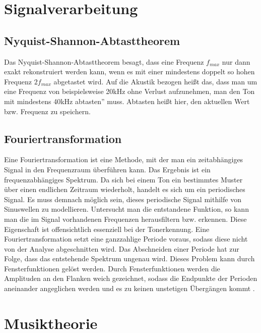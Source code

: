 \section{Signalverarbeitung}
\subsection*{Nyquist-Shannon-Abtasttheorem}
\label{sec:Abtast}
Das Nyquist-Shannon-Abtasttheorem besagt, dass eine Frequenz $f_{max}$ nur dann exakt rekonstruiert werden kann, wenn es mit einer mindestens doppelt so hohen Frequenz $2f_{max}$ abgetastet wird. Auf die Akustik bezogen heißt das, dass man um eine Frequenz von beispielsweise 20kHz ohne Verlust aufzunehmen, man den Ton mit mindestens 40kHz \glqq abtasten'' muss. Abtasten heißt hier, den aktuellen Wert bzw. Frequenz zu speichern. 

\subsection*{Fouriertransformation}
\label{sec:Fouriertransformation}
Eine Fouriertransformation ist eine Methode, mit der man ein zeitabhängiges Signal in den Frequenzraum überführen kann. Das Ergebnis ist ein frequenzabhängiges Spektrum.
Da sich bei einem Ton ein bestimmtes Muster über einen endlichen Zeitraum wiederholt, handelt es sich um ein periodisches Signal. Es muss demnach möglich sein, dieses periodische Signal mithilfe von Sinuswellen zu modellieren. Untersucht man die entstandene Funktion, so kann man die im Signal vorhandenen Frequenzen herausfiltern bzw. erkennen. Diese Eigenschaft ist offensichtlich essenziell bei der Tonerkennung. Eine Fouriertransformation setzt eine ganzzahlige Periode voraus, sodass diese nicht von der Analyse abgeschnitten wird. Das Abschneiden einer Periode hat zur Folge, dass das entstehende Spektrum ungenau wird.
Dieses Problem kann durch Fensterfunktionen gelöst werden. Durch Fensterfunktionen werden die Amplituden an den Flanken weich gezeichnet, sodass die Endpunkte der Perioden aneinander angeglichen werden und es zu keinen unstetigen Übergängen kommt \cite{Butz2006}.

\section{Musiktheorie}
